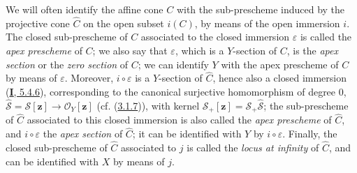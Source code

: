 \begin{env}[8.3.3]
\label{II.8.3.3}
We will often identify the affine cone $C$ with the sub-prescheme induced by the
projective cone $\widehat{C}$ on the open subset $i(C)$, by means of the open
immersion $i$. The closed sub-prescheme of $C$ associated to the closed
immersion $\varepsilon$ is called the \emph{apex prescheme} of $C$; we also
say that $\varepsilon$, which is a $Y$-section of $C$, is the \emph{apex
section} or the \emph{zero section} of $C$; we can identify $Y$ with the
apex prescheme of $C$ by means of $\varepsilon$. Moreover,
$i\circ\varepsilon$ is a $Y$-section of $\widehat{C}$, hence also a
closed immersion (\hyperref[I.5.4.6]{\textbf{I}, 5.4.6}), corresponding to
the canonical surjective homomorphism of degree $0$,
$\widehat{\mathcal{S}}=\mathcal{S}[\mathbf{z}]\to\mathcal{O}_Y[\mathbf{z}]$
(cf. (\hyperref[II.3.1.7]{3.1.7})), with kernel
$\mathcal{S}_+[\mathbf{z}]=\mathcal{S}_+\widehat{\mathcal{S}}$; the sub-prescheme of
$\widehat{C}$ associated to this closed immersion is also called the
\emph{apex prescheme} of $\widehat{C}$, and $i\circ\varepsilon$ the
\emph{apex section} of $\widehat{C}$; it can be identified with $Y$ by
$i\circ\varepsilon$. Finally, the closed sub-prescheme of $\widehat{C}$
associated to $j$ is called the \emph{locus at infinity} of $\widehat{C}$, and can
be identified with $X$ by means of $j$.
\end{env}

